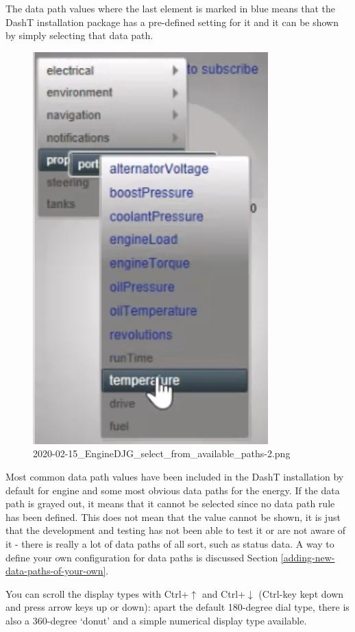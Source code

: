 \documentclass[11pt]{article}
\begin{document}
    The data path values where the last element is marked in blue means that
the DashT installation package has a pre-defined setting for it and it
can be shown by simply selecting that data path.

    \begin{figure}
\centering
\includegraphics{2020-02-15_EngineDJG_select_from_available_paths-2.png}
\caption{2020-02-15\_EngineDJG\_select\_from\_available\_paths-2.png}
\end{figure}

    Most common data path values have been included in the DashT
installation by default for engine and some most obvious data paths for
the energy. If the data path is grayed out, it means that it cannot be
selected since no data path rule has been defined. This does not mean
that the value cannot be shown, it is just that the development and
testing has not been able to test it or are not aware of it - there is
really a lot of data paths of all sort, such as status data. A way to
define your own configuration for data paths is discussed
Section \ref{adding-new-data-paths-of-your-own}.

    You can scroll the display types with Ctrl+\(\uparrow\) and
Ctrl+\(\downarrow\) (Ctrl-key kept down and press arrow keys up or
down): apart the default 180-degree dial type, there is also a
360-degree `donut' and a simple numerical display type available.
\end{document}
